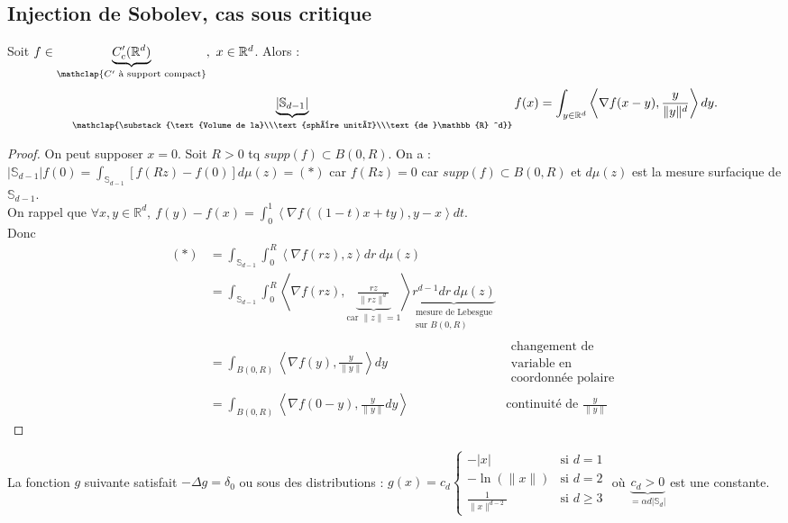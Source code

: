 \subsection{Injection de Sobolev, cas sous critique}
\begin{proposition}
    Soit $f\in \underbrace{C'_c(\mathbb{R} ^d)}_{\mathclap{C'\text{ à support compact}}}, ~x\in \mathbb{R} ^d$. Alors :\\
    $$\underbrace{|\mathbb{S}_{d-1}| }_{\mathclap{\substack{\text{Volume de la}\\\text{sphère unité}\\\text{de }\mathbb{R} ^d}}} f(x)=\int_{y\in \mathbb{R} ^d}\left<\nabla f(x-y), \frac{y}{\|y\|^d} \right>dy.$$
\end{proposition}
\begin{proof}
    On peut supposer $x=0.$ Soit $R>0$ tq $supp(f)\subset B(0,R).$ On a :\\
    $|\mathbb{S}_{d-1}| f(0)=\int_{\mathbb{S}_{d-1}}\left[f(Rz)-f(0)\right]d\mu(z)=(*)$ car $f(Rz)=0$ car $supp(f)\subset B(0,R)$ et $d\mu(z)$ est la mesure surfacique de $\mathbb{S}_{d-1}$.\\
    On rappel que $\forall x,y\in \mathbb{R} ^d,\ f(y)-f(x)=\int_0^1\left<\nabla f\left( \left( 1-t \right) x+ty \right) , y-x \right>dt.$ \\
    Donc
    \begin{align*}
        (*) &= \int_{\mathbb{S}_{d-1}}\int_{0}^{R} \left<\nabla f(rz),z \right>dr~d\mu(z)\\
            &=\int_{\mathbb{S}_{d-1}}\int_{0}^{R} \left<\nabla f(rz), \underbrace{\frac{rz}{\|rz\|^d}}_{\text{car }\|z\|=1} \right> \underbrace{r^{d-1}dr~d\mu(z)}_{\substack{\text{mesure de Lebesgue}\\\text{sur }B(0,R)}}\\
            &= \int_{B(0,R)}\left<\nabla f(y),\frac{y}{\|y\|} \right>dy &\substack{\text{changement de}\\\text{variable en}\\\text{coordonnée polaire}}\\
            &=\int_{B(0,R)}\left<\nabla f(0-y), \frac{y}{\|y\|}dy \right> &\text{continuité de $\frac{y}{\|y\|}$ }
    \end{align*}
\end{proof}
\begin{corollaire}
    La fonction $g$ suivante satisfait $-\Delta g=\delta_0$ ou  sous des distributions : $g(x)=c_d
    \begin{cases}
        -|x| &\text{si }d=1\\
        -\ln(\|x\|) &\text{si }d=2\\
        \frac{1}{\|x\|^{d-2}} &\text{si }d\ge 3
    \end{cases}$ où $\underbrace{c_d>0}_{=\alpha d|\mathbb{S}_d| }$ est une constante.
\end{corollaire}
